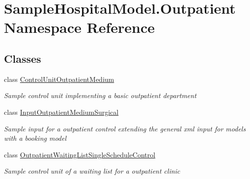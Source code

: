 \hypertarget{namespace_sample_hospital_model_1_1_outpatient}{}\section{Sample\+Hospital\+Model.\+Outpatient Namespace Reference}
\label{namespace_sample_hospital_model_1_1_outpatient}
\subsection*{Classes}
\begin{DoxyCompactItemize}
\item 
class \hyperlink{class_sample_hospital_model_1_1_outpatient_1_1_control_unit_outpatient_medium}{Control\+Unit\+Outpatient\+Medium}
\begin{DoxyCompactList}\small\item\em Sample control unit implementing a basic outpatient department \end{DoxyCompactList}\item 
class \hyperlink{class_sample_hospital_model_1_1_outpatient_1_1_input_outpatient_medium_surgical}{Input\+Outpatient\+Medium\+Surgical}
\begin{DoxyCompactList}\small\item\em Sample input for a outpatient control extending the general xml input for models with a booking model \end{DoxyCompactList}\item 
class \hyperlink{class_sample_hospital_model_1_1_outpatient_1_1_outpatient_waiting_list_single_schedule_control}{Outpatient\+Waiting\+List\+Single\+Schedule\+Control}
\begin{DoxyCompactList}\small\item\em Sample control unit of a waiting list for a outpatient clinic \end{DoxyCompactList}\end{DoxyCompactItemize}
